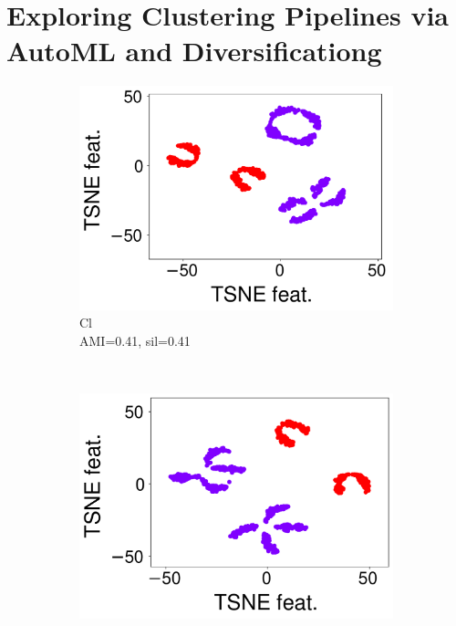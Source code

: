 
\chapter{Exploring Clustering Pipelines via AutoML and Diversificationg}
\label{data-centric-chap:unsupervised}

\begin{figure}[t]
    \begin{subfigure}[t]{0.23\columnwidth}
        \centering
        \includegraphics[scale=.15]{chapters/data-centric/unsupervised/img/cl.pdf}
        \caption{Cl \cite{Tschechlov2021}\\ \scriptsize{AMI=0.41, sil=0.41}}
        \label{clustering-fig:ca3}
    \end{subfigure}
    ~
    \begin{subfigure}[t]{0.23\columnwidth}
        \centering
        \includegraphics[scale=.15]{chapters/data-centric/unsupervised/img/ft_cl.pdf}

\end{subfigure}
\end{figure}
